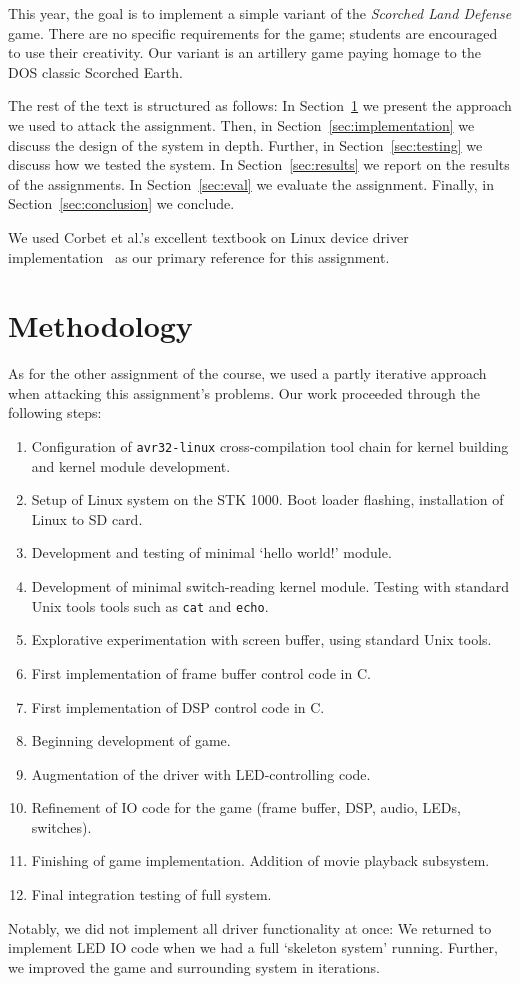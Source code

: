 \documentclass[a4paper,10pt]{article}
\begin{document}
This year, the goal is to implement a simple variant of the \emph{Scorched
Land Defense} game. There are no specific requirements for the game; students
are encouraged to use their creativity. Our variant is an artillery game
paying homage to the DOS classic Scorched Earth. 

The rest of the text is structured as follows: In Section~\ref{sec:method} we
present the approach we used to attack the assignment. Then, in
Section~\ref{sec:implementation} we discuss the design of the system in depth.
Further, in Section~\ref{sec:testing} we discuss how we tested the system. In
Section~\ref{sec:results} we report on the results of the assignments.  In
Section~\ref{sec:eval} we evaluate the assignment. Finally, in
Section~\ref{sec:conclusion} we conclude.

We used Corbet et al.'s excellent textbook on Linux device driver
implementation~\cite{devicedrivers} as our primary reference for this
assignment.

\section{Methodology}
\label{sec:method}
As for the other assignment of the course, we used a partly iterative approach
when attacking this assignment's problems.  Our work proceeded through the
following steps:
\begin{enumerate}
  \footnotesize
  \item Configuration of \texttt{avr32-linux} cross-compilation tool chain 
      for kernel building and kernel module development.
  \item Setup of Linux system on the STK 1000. Boot loader flashing,
      installation of Linux to SD card. 
  \item Development and testing of minimal `hello world!' module.
  \item Development of minimal switch-reading kernel module. Testing with
      standard Unix tools tools such as \texttt{cat} and \texttt{echo}.
  \item Explorative experimentation with screen buffer, using standard Unix
      tools.
  \item First implementation of frame buffer control code in C.
  \item First implementation of DSP control code in C.
  \item Beginning development of game.
  \item Augmentation of the driver with LED-controlling code.
  \item Refinement of IO code for the game (frame buffer, DSP, audio, LEDs,
      switches).
  \item Finishing of game implementation. Addition of movie playback
      subsystem.
  \item Final integration testing of full system.
\end{enumerate}
Notably, we did not implement all driver functionality at once: We returned to
implement LED IO code when we had a full `skeleton system' running. Further,
we improved the game and surrounding system in iterations.
\end{document}
